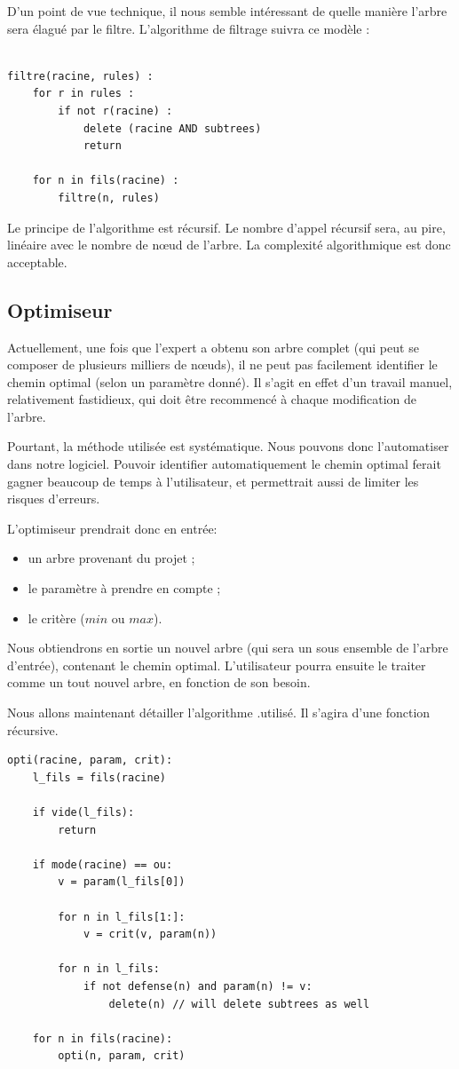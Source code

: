 		D'un point de vue technique, il nous semble intéressant de quelle manière l'arbre sera élagué par le filtre.
		L'algorithme de filtrage suivra ce modèle :

		\begin{lstlisting}

filtre(racine, rules) :
	for r in rules :
		if not r(racine) :
			delete (racine AND subtrees)
			return

	for n in fils(racine) :
		filtre(n, rules)

		\end{lstlisting}
	
		Le principe de l'algorithme est récursif.
		Le nombre d'appel récursif sera, au pire, linéaire avec le nombre de nœud de l'arbre.
		La complexité algorithmique est donc acceptable.

	\subsection{Optimiseur}
		Actuellement, une fois que l'expert a obtenu son arbre complet (qui peut se composer de plusieurs milliers de nœuds), il ne peut pas facilement identifier le chemin optimal (selon un paramètre donné).
		Il s'agit en effet d'un travail manuel, relativement fastidieux, qui doit être recommencé à chaque modification de l'arbre.
		
		Pourtant, la méthode utilisée est systématique. Nous pouvons donc l'automatiser dans notre logiciel. Pouvoir identifier automatiquement le chemin optimal ferait gagner beaucoup de temps à l'utilisateur, et permettrait aussi de limiter les risques d'erreurs.
		
		L'optimiseur prendrait donc en entrée:
		\begin{itemize}
			\item un arbre provenant du projet ;
			\item le paramètre à prendre en compte ;
			\item le critère ($min$ ou $max$).
		\end{itemize}
		
		Nous obtiendrons en sortie un nouvel arbre (qui sera un sous ensemble de l'arbre d'entrée), contenant le chemin optimal. 
		L'utilisateur pourra ensuite le traiter comme un tout nouvel arbre, en fonction de son besoin.
		
		Nous allons maintenant détailler l'algorithme %
		.utilisé. Il s'agira d'une fonction récursive.

		\begin{lstlisting}
opti(racine, param, crit):
	l_fils = fils(racine)

	if vide(l_fils):
		return

	if mode(racine) == ou:
		v = param(l_fils[0])

		for n in l_fils[1:]:
			v = crit(v, param(n))

		for n in l_fils:
			if not defense(n) and param(n) != v:
				delete(n) // will delete subtrees as well
	
	for n in fils(racine):
		opti(n, param, crit)
		\end{lstlisting}

